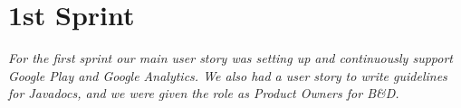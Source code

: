 \chapter{1st Sprint} \label{ChapSprint1}
\textit{For the first sprint our main user story was setting up and continuously support Google Play and Google Analytics. We also had a user story to write guidelines for Javadocs, and we were given the role as Product Owners for B\&D.}





